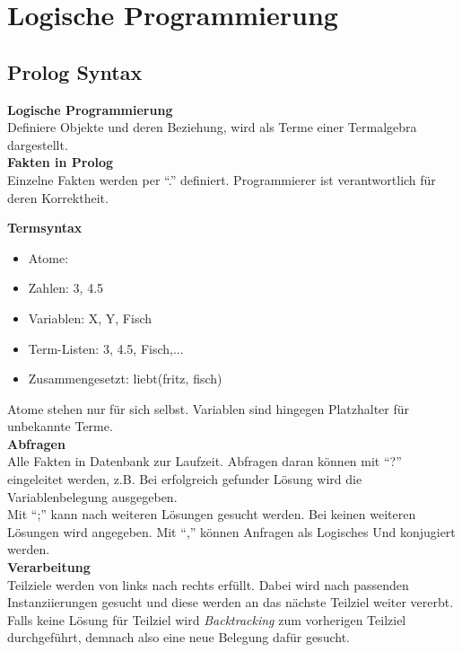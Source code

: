 

\lstset{language=Prolog,mathescape=true}

\section{Logische Programmierung}%
\label{lp:sec:logische-programmierung}

\subsection{Prolog Syntax}%
\label{lp:sub:prolog-syntax}
\textbf{Logische Programmierung}\\
Definiere Objekte und deren Beziehung, wird als Terme einer Termalgebra dargestellt.\\

\textbf{Fakten in Prolog}\\
Einzelne Fakten werden per \enquote{.} definiert.
Programmierer ist verantwortlich für deren Korrektheit.

\textbf{Termsyntax}
\begin{itemize}
  \item Atome: 
  \item Zahlen: 3, 4.5
  \item Variablen: X, Y, Fisch
  \item Term-Listen: 3, 4.5, Fisch,...
  \item Zusammengesetzt: liebt(fritz, fisch)
\end{itemize}
Atome stehen nur für sich selbst. Variablen sind hingegen Platzhalter für unbekannte Terme.\\

\textbf{Abfragen}\\
Alle Fakten in Datenbank zur Laufzeit. Abfragen daran können mit \enquote{?} eingeleitet werden, z.B. 
Bei erfolgreich gefunder Lösung wird die Variablenbelegung ausgegeben.\\

Mit \enquote{;} kann nach weiteren Lösungen gesucht werden. Bei keinen weiteren Lösungen wird  angegeben.
Mit \enquote{,} können Anfragen als Logisches Und konjugiert werden.\\

\textbf{Verarbeitung}\\
Teilziele werden von links nach rechts erfüllt. Dabei wird nach passenden Instanziierungen gesucht und diese werden
an das nächste Teilziel weiter vererbt. Falls keine Lösung für Teilziel wird \textit{Backtracking} zum vorherigen Teilziel
durchgeführt, demnach also eine neue Belegung dafür gesucht.\\

